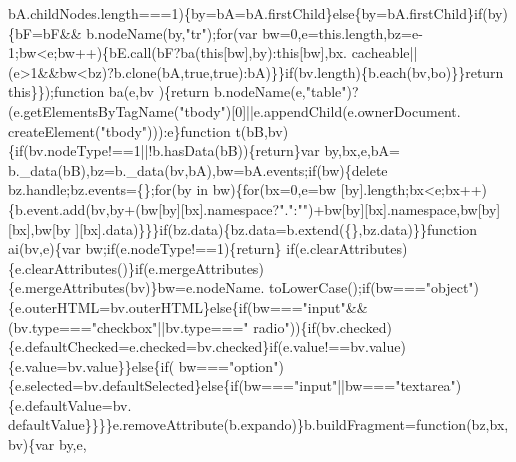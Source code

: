 \begin{DoxyCode}
      bA.childNodes.length===1)\{by=bA=bA.firstChild\}\textcolor{keywordflow}{else}\{by=bA.firstChild\}\textcolor{keywordflow}{if}(by)\{bF=bF&&
      b.nodeName(by,\textcolor{stringliteral}{"tr"});\textcolor{keywordflow}{for}(var bw=0,e=this.length,bz=e-1;bw<e;bw++)\{bE.call(bF?ba(\textcolor{keyword}{this}[bw],by):\textcolor{keyword}{this}[bw],bx.
      cacheable||(e>1&&bw<bz)?b.clone(bA,\textcolor{keyword}{true},\textcolor{keyword}{true}):bA)\}\}\textcolor{keywordflow}{if}(bv.length)\{b.each(bv,bo)\}\}\textcolor{keywordflow}{return} \textcolor{keyword}{this}\}\});\textcolor{keyword}{function} ba(e,bv
      )\{\textcolor{keywordflow}{return} b.nodeName(e,\textcolor{stringliteral}{"table"})?(e.getElementsByTagName(\textcolor{stringliteral}{"tbody"})[0]||e.appendChild(e.ownerDocument.
      createElement(\textcolor{stringliteral}{"tbody"}))):e\}\textcolor{keyword}{function} t(bB,bv)\{\textcolor{keywordflow}{if}(bv.nodeType!==1||!b.hasData(bB))\{\textcolor{keywordflow}{return}\}var by,bx,e,bA=
      b.\_data(bB),bz=b.\_data(bv,bA),bw=bA.events;\textcolor{keywordflow}{if}(bw)\{\textcolor{keyword}{delete} bz.handle;bz.events=\{\};\textcolor{keywordflow}{for}(by in bw)\{\textcolor{keywordflow}{for}(bx=0,e=bw
      [by].length;bx<e;bx++)\{b.event.add(bv,by+(bw[by][bx].\textcolor{keyword}{namespace}?\textcolor{stringliteral}{"."}:\textcolor{stringliteral}{""})+bw[by][bx].\textcolor{keyword}{namespace},bw[by][bx],bw[by
      ][bx].data)\}\}\}\textcolor{keywordflow}{if}(bz.data)\{bz.data=b.extend(\{\},bz.data)\}\}\textcolor{keyword}{function} ai(bv,e)\{var bw;\textcolor{keywordflow}{if}(e.nodeType!==1)\{\textcolor{keywordflow}{return}\}\textcolor{keywordflow}{
      if}(e.clearAttributes)\{e.clearAttributes()\}\textcolor{keywordflow}{if}(e.mergeAttributes)\{e.mergeAttributes(bv)\}bw=e.nodeName.
      toLowerCase();\textcolor{keywordflow}{if}(bw===\textcolor{stringliteral}{"object"})\{e.outerHTML=bv.outerHTML\}\textcolor{keywordflow}{else}\{\textcolor{keywordflow}{if}(bw===\textcolor{stringliteral}{"input"}&&(bv.type===\textcolor{stringliteral}{"checkbox"}||bv.type===\textcolor{stringliteral}{"
      radio"}))\{\textcolor{keywordflow}{if}(bv.checked)\{e.defaultChecked=e.checked=bv.checked\}\textcolor{keywordflow}{if}(e.value!==bv.value)\{e.value=bv.value\}\}\textcolor{keywordflow}{else}\{\textcolor{keywordflow}{if}(
      bw===\textcolor{stringliteral}{"option"})\{e.selected=bv.defaultSelected\}\textcolor{keywordflow}{else}\{\textcolor{keywordflow}{if}(bw===\textcolor{stringliteral}{"input"}||bw===\textcolor{stringliteral}{"textarea"})\{e.defaultValue=bv.
      defaultValue\}\}\}\}e.removeAttribute(b.expando)\}b.buildFragment=\textcolor{keyword}{function}(bz,bx,bv)\{var by,e,

\end{DoxyCode}
